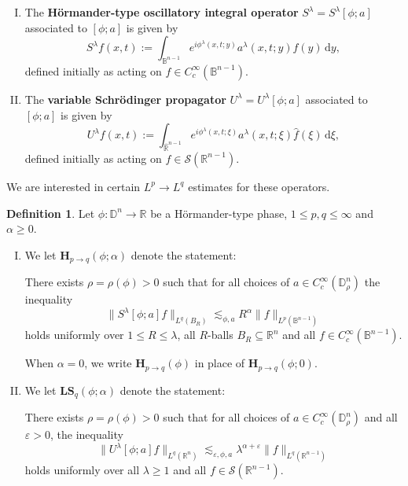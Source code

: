 \documentclass[reqno]{amsart}
\numberwithin{equation}{section}
\newcommand{\B}{\mathbb{B}}
\newcommand{\D}{\mathbb{D}}
\newcommand{\R}{\mathbb{R}}
\newcommand{\cS}{\mathcal{S}}
\newcommand{\ud}{\mathrm{d}}
\newcommand{\bH}{\mathbf{H}}
\newcommand{\bLS}{\mathbf{LS}}
\theoremstyle{plain}
\theoremstyle{definition}
\newtheorem{definition}[theorem]{Definition}
\begin{document}
\begin{enumerate}[I)]
    \item The \textbf{H\"ormander-type oscillatory integral operator} $S^{\lambda} = S^{\lambda}[\phi; a]$ associated to $[\phi; a]$ is given by
\begin{equation*}
S^{\lambda}f(x,t) :=  \int_{\B^{n-1}} e^{i \phi^{\lambda}(x,t; y)}a^{\lambda}(x,t;y) f(y)\,\ud y,
\end{equation*}
defined initially as acting on $f \in C^{\infty}_c(\B^{n-1})$.
    \item The  \textbf{variable Schr\"odinger propagator} $U^{\lambda} = U^{\lambda}[\phi; a]$ associated to $[\phi; a]$ is given by
\begin{equation*}
U^{\lambda}f(x,t) :=  \int_{\widehat{\R}^{n-1}} e^{i \phi^{\lambda}(x,t; \xi)}a^{\lambda}(x,t;\xi) \hat{f}(\xi)\,\ud \xi,
\end{equation*}
defined initially as acting on $f \in \cS(\R^{n-1})$.
\end{enumerate}

We are interested in certain $L^p \to L^q$ estimates for these operators. 

\begin{definition} Let $\phi \colon \D^n \to \R$ be a H\"ormander-type phase, $1 \leq p, q \leq \infty$ and $\alpha \geq 0$. 


\begin{enumerate}[I)]
    \item We let $\bH_{p \to q}(\phi; \alpha)$ denote the statement: \medskip
    
    \noindent There exists $\rho = \rho(\phi) >0$ such that for all choices of $a \in C^{\infty}_c(\D^n_{\rho})$  the inequality
    \begin{equation*}
        \|S^{\lambda}[\phi; a]f\|_{L^q(B_R)} \lesssim_{\phi, a} R^{\alpha} \|f\|_{L^p(\B^{n-1})}
    \end{equation*}
    holds uniformly over $1 \leq R \leq \lambda$, all $R$-balls $B_R \subseteq \R^n$ and all $f \in C^{\infty}_c(\B^{n-1})$.\medskip

    \noindent When $\alpha = 0$, we write $\bH_{p \to q}(\phi)$ in place of $\bH_{p \to q}(\phi; 0)$.\medskip

    \item We let $\bLS_q(\phi; \alpha)$ denote the statement: \medskip
    
    \noindent 
    There exists $\rho = \rho(\phi) >0$ such that for all choices of $a \in C^{\infty}_c(\D^n_{\rho})$ and all  $\varepsilon > 0$, the inequality
    \begin{equation*}
        \|U^{\lambda}[\phi; a]f\|_{L^q(\R^n)} \lesssim_{\varepsilon, \phi, a} \lambda^{\alpha + \varepsilon}\|f\|_{L^q(\R^{n-1})}
    \end{equation*}
     holds uniformly over all $\lambda \geq 1$ and all $f \in \cS(\R^{n-1})$. 
\end{enumerate} 
\end{definition}
\end{document}
